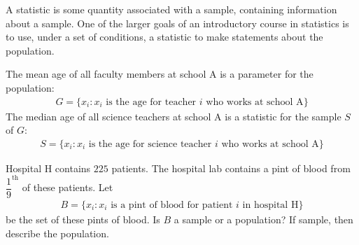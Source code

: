 \begin{definition}
A statistic is some quantity associated with a sample, containing information about a sample. One of the larger goals of an introductory course in statistics is to use, under a set of conditions, a statistic to make statements about the population.  
\end{definition}

\begin{example}
The mean age of all faculty members at school A is a parameter for the population:
\begin{align*}
    G = \{x_{i}: x_{i} \hspace{4pt} \text{is the age for teacher} \hspace{4pt} i \hspace{4pt} \text{who works at school A}\}
\end{align*}
The median age of all science teachers at school A is a statistic for the sample $S$ of $G$:
\begin{align*}
    S = \{x_{i}: x_{i} \hspace{4pt} \text{is the age for science teacher} \hspace{4pt} i \hspace{4pt} \text{who works at school A}\}
\end{align*}
\end{example}

\begin{exercise}
Hospital H contains $225$ patients. The hospital lab contains a pint of blood from $\dfrac{1}{9}^{\text{th}}$ of these patients. Let
\begin{align*}
    B = \{x_{i}: x_{i} \hspace{4pt} \text{is a pint of blood for patient} \hspace{4pt} i \hspace{4pt} \text{in hospital H}\}
\end{align*}
be the set of these pints of blood. Is $B$ a sample or a population? If sample, then describe the population.
\end{exercise}

